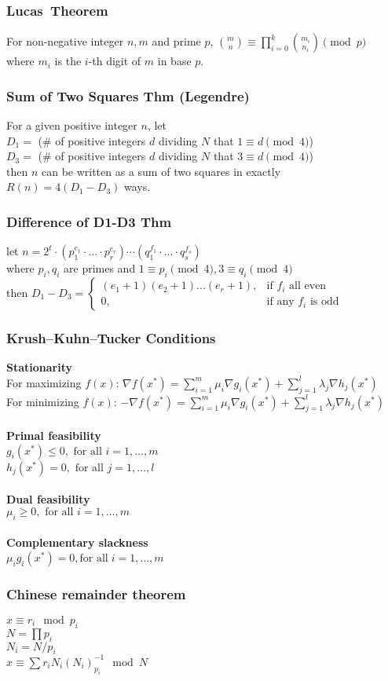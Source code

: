 \subsubsection{Lucas\textquotesingle \ Theorem}
	For non-negative integer $n,m$ and prime $p$, $\binom{m}{n}\equiv\prod_{i=0}^k\binom{m_i}{n_i}\pmod p$\\
	where $m_i$ is the $i$-th digit of $m$ in base $p$.
\subsubsection{Sum of Two Squares Thm (Legendre)}
	For a given positive integer $n$, let\\
	$D_1 =$ (\# of positive integers $d$ dividing $N$ that $1\equiv d\pmod 4$)\\
	$D_3 =$ (\# of positive integers $d$ dividing $N$ that $3\equiv d\pmod 4$)\\
	then $n$ can be written as a sum of two squares in exactly\\
	$R(n) = 4(D_1-D_3)$ ways.
\subsubsection{Difference of D1-D3 Thm}
	let $n = 2^t \cdot (p_1^{e_1} \cdot ... \cdot p_r^{e_r}) \cdots (q_1^{f_1} \cdot ... \cdot q_s^{f_s})$\\
	where $p_i, q_i$ are primes and $1 \equiv p_i\pmod 4 , 3 \equiv q_i\pmod 4$\\
	then
  $ D_1 - D_3 = \begin{cases}
  (e_1+1)(e_2+1)...(e_r+1), & \text{if }f_i\text{ all even}\\
	0, & \text{if any }f_i \text{ is odd}
  \end{cases} $
\subsubsection{Krush–Kuhn–Tucker Conditions}
  \textbf{Stationarity}\\
  For maximizing $f(x)$: $\nabla f(x^*) = \sum_{i=1}^m \mu_i \nabla g_i(x^*) + \sum_{j=1}^l \lambda_j \nabla h_j(x^*)$\\
  For minimizing $f(x)$: $-\nabla f(x^*) = \sum_{i=1}^m \mu_i \nabla g_i(x^*) + \sum_{j=1}^l \lambda_j \nabla h_j(x^*)$ \\
\\
  \textbf{Primal feasibility}\\
  $g_i(x^*) \le 0, \mbox{ for all } i = 1, \ldots, m$\\
  $h_j(x^*) = 0, \mbox{ for all } j = 1, \ldots, l \,\!$\\
\\
  \textbf{Dual feasibility}\\
  $\mu_i \ge 0, \mbox{ for all } i = 1, \ldots, m$\\
\\
  \textbf{Complementary slackness}\\
  $\mu_i g_i (x^*) = 0, \mbox{for all}\; i = 1,\ldots,m$
\subsubsection{Chinese remainder theorem}
  $x \equiv r_i \mod p_i $\\
  $N = \prod p_i$\\
  $N_i = N / p_i$\\
  $x \equiv \sum r_i N_i (N_i)^{-1}_{p_i} \mod N$

